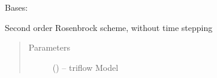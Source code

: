 \documentclass[letterpaper,10pt,english]{sphinxmanual}
\begin{document}

\begin{fulllineitems}
\label{\detokenize{triflow.plugins:triflow.plugins.schemes.ROS2}}
Bases: {\hyperref[\detokenize{triflow.plugins:triflow.plugins.schemes.ROW_general}]{}}

Second order Rosenbrock scheme, without time stepping
\begin{quote}\begin{description}
\item[{Parameters}] \leavevmode
{} () -- triflow Model

\end{description}\end{quote}

\end{fulllineitems}

\end{document}

